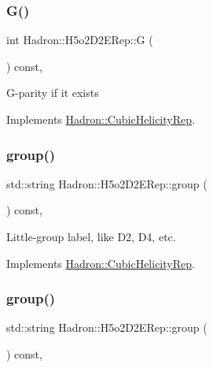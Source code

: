 \subsubsection{\texorpdfstring{G()}{G()}\hspace{0.1cm}{\footnotesize\ttfamily [3/3]}}
{\footnotesize\ttfamily int Hadron\+::\+H5o2\+D2\+E\+Rep\+::G (\begin{DoxyParamCaption}{ }\end{DoxyParamCaption}) const\hspace{0.3cm}{\ttfamily [inline]}, {\ttfamily [virtual]}}

G-\/parity if it exists 

Implements \mbox{\hyperlink{structHadron_1_1CubicHelicityRep_a50689f42be1e6170aa8cf6ad0597018b}{Hadron\+::\+Cubic\+Helicity\+Rep}}.

\mbox{\label{structHadron_1_1H5o2D2ERep_aba8c064b1c4731c813d921e68d04d021}} 
\subsubsection{\texorpdfstring{group()}{group()}\hspace{0.1cm}{\footnotesize\ttfamily [1/5]}}
{\footnotesize\ttfamily std\+::string Hadron\+::\+H5o2\+D2\+E\+Rep\+::group (\begin{DoxyParamCaption}{ }\end{DoxyParamCaption}) const\hspace{0.3cm}{\ttfamily [inline]}, {\ttfamily [virtual]}}

Little-\/group label, like D2, D4, etc. 

Implements \mbox{\hyperlink{structHadron_1_1CubicHelicityRep_a101a7d76cd8ccdad0f272db44b766113}{Hadron\+::\+Cubic\+Helicity\+Rep}}.

\mbox{\label{structHadron_1_1H5o2D2ERep_aba8c064b1c4731c813d921e68d04d021}} 
\subsubsection{\texorpdfstring{group()}{group()}\hspace{0.1cm}{\footnotesize\ttfamily [2/5]}}
{\footnotesize\ttfamily std\+::string Hadron\+::\+H5o2\+D2\+E\+Rep\+::group (\begin{DoxyParamCaption}{ }\end{DoxyParamCaption}) const\hspace{0.3cm}{\ttfamily [inline]}, {\ttfamily [virtual]}}

